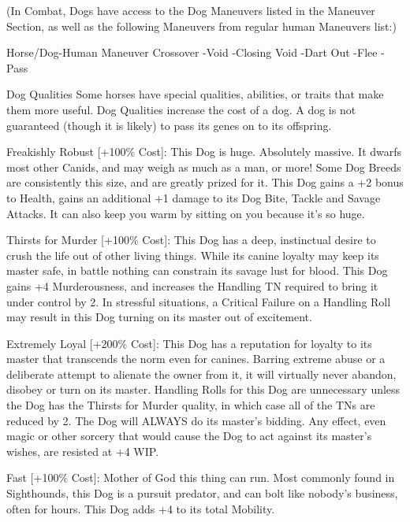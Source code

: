 \documentclass[oneside,11pt,english]{book}
\begin{document}
 

(In Combat, Dogs have access to the Dog Maneuvers listed in the Maneuver Section, as well as the 
following Maneuvers from regular human Maneuvers list:) 

 

Horse/Dog-Human Maneuver Crossover 
-Void 
-Closing Void 
-Dart Out 
-Flee 
-Pass 

 

Dog Qualities 
Some horses have special qualities, abilities, or traits that make them more useful. Dog Qualities increase 
the cost of a dog. A dog is not guaranteed (though it is likely) to pass its genes on to its offspring. 

 

Freakishly Robust [+100\% Cost]: This Dog is huge. Absolutely massive. It dwarfs most other Canids, 
and may weigh as much as a man, or more! Some Dog Breeds are consistently this size, and are greatly 
prized for it. 
This Dog gains a +2 bonus to Health, gains an additional +1 damage to its Dog Bite, Tackle and Savage 
Attacks. It can also keep you warm by sitting on you because it’s so huge. 

 

Thirsts for Murder [+100\% Cost]: This Dog has a deep, instinctual desire to crush the life out of other 
living things. While its canine loyalty may keep its master safe, in battle nothing can constrain its savage 
lust for blood. 
This Dog gains +4 Murderousness, and increases the Handling TN required to bring it under control by 
2. In stressful situations, a Critical Failure on a Handling Roll may result in this Dog turning on its master 
out of excitement. 

 

Extremely Loyal [+200\% Cost]: This Dog has a reputation for loyalty to its master that transcends the 
norm even for canines. Barring extreme abuse or a deliberate attempt to alienate the owner from it, it will 
virtually never abandon, disobey or turn on its master. 
Handling Rolls for this Dog are unnecessary unless the Dog has the Thirsts for Murder quality, in which 
case all of the TNs are reduced by 2. The Dog will ALWAYS do its master’s bidding. Any effect, even 
magic or other sorcery that would cause the Dog to act against its master’s wishes, are resisted at +4 WIP. 

 

Fast [+100\% Cost]: Mother of God this thing can run. Most commonly found in Sighthounds, this Dog is 
a pursuit predator, and can bolt like nobody’s business, often for hours. 
This Dog adds +4 to its total Mobility. 
\end{document}
